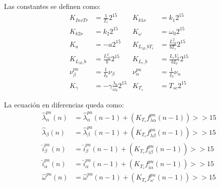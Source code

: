 \documentclass{article}
\begin{document}
        Las constantes se definen como:
        \begin{equation}
            \begin{aligned}
                K_{InvTr}       &= \frac{1}{T_r} 2^{15}           &
                K_{k1\nu}       &= k_1 2^{15} \\
                K_{k2\nu}       &= k_2 2^{15} &
                K_{\omega}      &= \omega_0 2^{15}                 \\
                K_a             &=    -a 2^{15}                    &
                K_{L_M\_bT_r}   &= \frac{L_M^2}{b T_r}2^{15}      \\
                 K_{L_M\_b}     &=  \frac{L_M^2}{b}2^{15}                   &
                K_{L_r\_b}      &=  \frac{L_r V_0}{b I_0}2^{15}             \\
                \nu_\beta^{pu}  &= \frac{1}{I_0} \nu_\beta                  &
                \nu_\alpha^{pu} &= \frac{1}{I_0} \nu_\alpha                 \\
                 K_\gamma       &= -\gamma \frac{\lambda_0}{\omega_0}2^{15} &
                K_{T_s}         &= T_{sc} 2^{15}  
            \end{aligned}
        \end{equation}

        La ecuación en diferencias queda como: 
        \begin{equation}
            \begin{aligned}
                \hat{\lambda}_\alpha^{pu}(n) &= \hat{\lambda}_\alpha^{pu}\left(n-1\right)
                    + \left( K_{T_s}  f_{\lambda\alpha}^{pu}\left(n-1\right) \right) >> 15 \\
                \hat{\lambda}_\beta(n) &= \hat{\lambda}_\beta^{pu}\left(n-1\right)
                    + \left(  K_{T_s} f_{\lambda\beta}^{pu} \left(n-1\right) \right) >> 15 \\
                \hat{i}_\beta^{pu}(n) &= \hat{i}_\beta^{pu} \left(n-1\right)
                    +  \left(  K_{T_s}  f_{i\beta}^{pu} \left(n-1\right) \right) >> 15 \\
                \hat{i}_\alpha^{pu}(n) &= \hat{i}_\alpha^{pu} \left(n-1\right) 
                    +  \left( K_{T_s} f_{i\alpha}^{pu} \left(n-1\right) \right) >> 15 \\
                \hat{\omega}^{pu}(n) &= \hat{\omega}^{pu} \left(n-1\right)
                    +  \left(  K_{T_s}  f_{\omega}^{pu}\left(n-1\right)  \right) >> 15
            \end{aligned}
        \end{equation}
\end{document}
